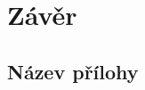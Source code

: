 \documentclass[12pt]{report}
\begin{document}



\chapter*{Závěr}


\printbibliography
{}
\printglossary[title={Zkratky}]
\listoffigures
\listoftables

\begin{appendices}
	\chapter{Název přílohy}
\end{appendices}
\end{document}
